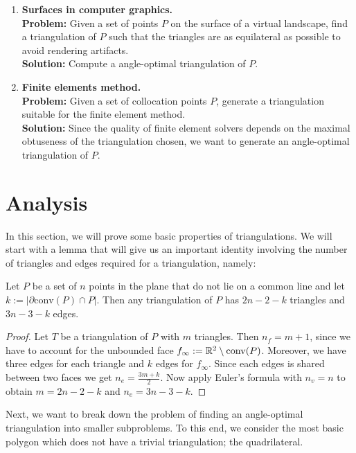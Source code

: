     \begin{enumerate}
        \item \textbf{Surfaces in computer graphics.} \\
        \textbf{Problem:} Given a set of points $P$ on the surface of a virtual landscape, find a triangulation of $P$ such that the triangles are as equilateral as possible to avoid rendering artifacts. \\
        \textbf{Solution:} Compute a angle-optimal triangulation of $P$.
    
        \item \textbf{Finite elements method.} \\ 
        \textbf{Problem:} Given a set of collocation points $P$, generate a triangulation suitable for the finite element method. \\
        \textbf{Solution:} Since the quality of finite element solvers depends on the maximal obtuseness of the triangulation chosen, we want to generate an angle-optimal triangulation of $P$.
    \end{enumerate}

\section{Analysis}
    In this section, we will prove some basic properties of triangulations. We will start with a lemma that will give us an important identity involving the number of triangles and edges required for a triangulation, namely:

    \begin{lemma}    
        Let $P$ be a set of $n$ points in the plane that do not lie on a common line and let $k := \vert \partial\mathrm{conv}(P) \cap P \vert$. Then any triangulation of $P$ has $2n - 2 - k$ triangles and $3n - 3 - k$ edges. 
    \end{lemma}
    \begin{proof}
        Let $T$ be a triangulation of $P$ with $m$ triangles. Then $n_f = m + 1$, since we have to account for the unbounded face $f_\infty := \mathbb{R}^2 \setminus \mathrm{conv}(P)$. Moreover, we have three edges for each triangle and $k$ edges for $f_\infty$. Since each edges is shared between two faces we get $n_e = \frac{3m + k}{2}$. Now apply Euler's formula with $n_v = n$ to obtain $m = 2n - 2 - k$ and $n_e = 3n - 3 - k$. 
    \end{proof}

    Next, we want to break down the problem of finding an angle-optimal triangulation into smaller subproblems. To this end, we consider the most basic polygon which does not have a trivial triangulation; the quadrilateral. 

